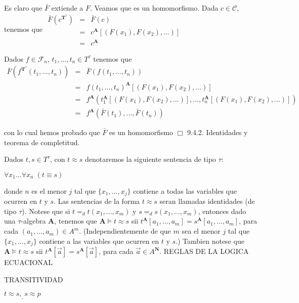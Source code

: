 Es claro que \(\bar{F}\) extiende a \(F\). Veamos que es un homomorfismo. Dada \( c\in \mathcal{C}\), tenemos que
\(\displaystyle \begin{array}{lll} \bar{F}(c^{\mathbf{T}^{\tau }}) & = & \bar{F}(c) \\ & = & c^{\mathbf{A}}[(F(x_{1}),F(x_{2}),...)] \\ & = & c^{\mathbf{A}} \end{array} \)

Dados \(f\in \mathcal{F}_{n}\), \(t_{1},...,t_{n}\in T^{\tau }\) tenemos que
\(\displaystyle \begin{array}{lll} \bar{F}(f^{\mathbf{T}^{\tau }}(t_{1},...,t_{n})) & = & \bar{F} (f(t_{1},...,t_{n})) \\ & = & f(t_{1},...,t_{n})^{\mathbf{A}}[(F(x_{1}),F(x_{2}),...)] \\ & = & f^{\mathbf{A}}(t_{1}^{\mathbf{A}}[(F(x_{1}),F(x_{2}),...)],...,t_{n}^{ \mathbf{A}}[(F(x_{1}),F(x_{2}),...)]) \\ & = & f^{\mathbf{A}}(\bar{F}(t_{1}),...,\bar{F}(t_{n})) \end{array} \)

con lo cual hemos probado que \(\bar{F}\) es un homomorfismo \(\Box\)
9.4.2. Identidades y teorema de completitud.

Dados \(t,s\in T^{\tau }\), con \(t\approx s\) denotaremos la siguiente sentencia de tipo \(\tau \):

\(\displaystyle \forall x_{1}...\forall x_{n}\;(t\equiv s) \)

donde \(n\) es el menor \(j\) tal que \(\{x_{1},...,x_{j}\}\) contiene a todas las variables que ocurren en \(t\) y \(s\). Las sentencias de la forma \(t\approx s\) seran llamadas identidades (de tipo \(\tau \)). Notese que si \(t=_{d}t(x_{1},...,x_{m})\) y \(s=_{d}s(x_{1},...,x_{m})\), entonces dado una \(\tau \)-algebra \(\mathbf{A}\), tenemos que \(\mathbf{A}\models t\approx s\) sii \(t^{\mathbf{A}}\left[ a_{1},...,a_{m}\right] =s^{\mathbf{A}}\left[ a_{1},...,a_{m}\right] \), para cada \((a_{1},...,a_{m})\in A^{m}\). (Independientemente de que \(m\) sea el menor \(j\) tal que \(\{x_{1},...,x_{j}\}\) contiene a las variables que ocurren en \(t\) y \(s\).) Tambien notese que \( \mathbf{A}\models t\approx s\) sii \(t^{\mathbf{A}}[\vec{a}]=s^{\mathbf{A}}[ \vec{a}]\), para cada \(\vec{a}\in A^{\mathbf{N}}\).
REGLAS DE LA LOGICA ECUACIONAL

TRANSITIVIDAD

\(\underline{t\approx s,\;s\approx p}\)

